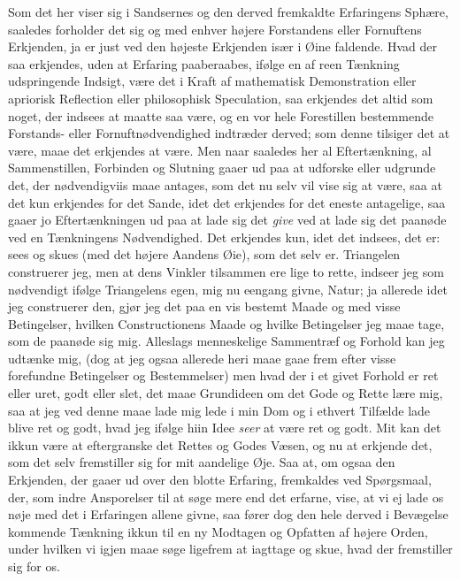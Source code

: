 \documentclass[12pt,a4paper]{book}
\newcommand{\apage}[1]{\marginnote{\footnotesize\textit{[#1]}}}
\begin{document}
Som det her viser sig i Sandsernes og den derved fremkaldte Erfaringens Sphære,
saaledes forholder det sig og med enhver højere Forstandens eller Fornuftens
Erkjenden, ja er just ved den højeste Erkjenden især i Øine faldende. Hvad \apage{6}  der
saa erkjendes, uden at Erfaring paaberaabes, ifølge en af reen Tænkning
udspringende Indsigt, være det i Kraft af mathematisk Demonstration eller
apriorisk Reflection eller philosophisk Speculation, saa erkjendes det altid som
noget, der indsees at maatte saa være, og en vor hele Forestillen bestemmende
Forstands- eller Fornuftnødvendighed indtræder derved; som denne tilsiger det at
være, maae det erkjendes at være. Men naar saaledes her al Eftertænkning, al
Sammenstillen, Forbinden og Slutning gaaer ud paa at udforske eller udgrunde
det, der nødvendigviis maae antages, som det nu selv vil vise sig at være, saa
at det kun erkjendes for det Sande, idet det erkjendes for det eneste
antagelige, saa gaaer jo Eftertænkningen ud paa at lade sig det \emph{give} ved
at lade sig det paanøde ved en Tænkningens Nødvendighed. Det erkjendes kun, idet
det indsees, det er: sees og skues (med det højere Aandens Øie), som det selv
er. Triangelen construerer jeg, men at dens Vinkler tilsammen ere lige to rette,
indseer jeg som nødvendigt ifølge Triangelens egen, mig nu eengang givne, Natur;
ja allerede idet jeg construerer den, gjør jeg det paa en vis bestemt Maade og
med visse Betingelser, hvilken Constructionens Maade og hvilke Betingelser jeg
maae tage, som de paanøde sig mig. Alleslags menneskelige Sammentræf og Forhold
kan jeg udtænke mig, (dog at jeg ogsaa allerede heri \apage{7}  maae gaae frem efter visse
forefundne Betingelser og Bestemmelser) men hvad der i et givet Forhold er ret
eller uret, godt eller slet, det maae Grundideen om det Gode og Rette lære mig,
saa at jeg ved denne maae lade mig lede i min Dom og i ethvert Tilfælde lade
blive ret og godt, hvad jeg ifølge hiin Idee \emph{seer} at være ret og godt. Mit kan
det ikkun være at eftergranske det Rettes og Godes Væsen, og nu at erkjende det,
som det selv fremstiller sig for mit aandelige Øje. Saa at, om ogsaa den
Erkjenden, der gaaer ud over den blotte Erfaring, fremkaldes ved Spørgsmaal,
der, som indre Ansporelser til at søge mere end det erfarne, vise, at vi ej lade
os nøje med det i Erfaringen allene givne, saa fører dog den hele derved i
Bevægelse kommende Tænkning ikkun til en ny Modtagen og Opfatten af højere
Orden, under hvilken vi igjen maae søge ligefrem at iagttage og skue, hvad der
fremstiller sig for os.
\end{document}
